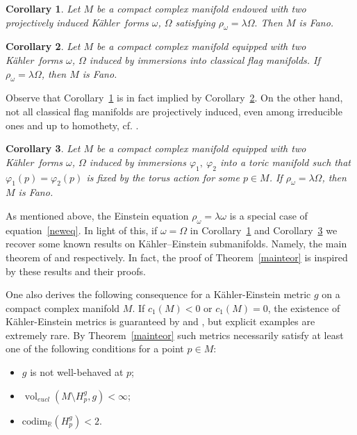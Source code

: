 \documentclass[12pt]{amsart}
\newcommand{\R}{\mathbb{R}}
\newcommand{\codim}{\mathrm{codim}}
\newcommand{\K}{K\"{a}hler}
\newcommand{\vol}{{\operatorname{vol}}}
\newtheorem{cor}{Corollary}
\begin{document}
\begin{cor}\label{Cor1}
Let $M$ be a compact complex manifold endowed with two projectively induced \K\ forms $\omega$, $\Omega$ satisfying
$\rho_\omega=\lambda\Omega.$ Then $M$ is Fano.
\end{cor}
\begin{cor}\label{Cor2}
	Let $M$ be a compact complex manifold equipped with two \K\ forms $\omega$, $\Omega$ induced by immersions into classical flag manifolds. If $\rho_\omega=\lambda\Omega$, then $M$ is Fano.
\end{cor}
Observe that Corollary~\ref{Cor1} is in fact implied by Corollary~\ref{Cor2}. On the other hand, not all classical flag manifolds are projectively induced, even among irreducible ones and up to homothety, cf. \cite{LoiMossa23Rigidity}.

\begin{cor}\label{Cor3}
	Let $M$ be a compact complex manifold equipped with two \K\ forms $\omega$, $\Omega$ induced by immersions $\varphi_1,\ \varphi_2$ into a toric manifold such that $\varphi_1(p)=\varphi_2(p)$ is fixed by the torus action for some $p\in M$. If $\rho_\omega=\lambda\Omega$, then $M$ is Fano.
\end{cor}

As mentioned above, the Einstein equation $\rho_\omega=\lambda\omega$ is a special case of  equation~\eqref{neweq}.
In light of this, if $\omega=\Omega$ in  Corollary~\ref{Cor1} and Corollary~\ref{Cor3} we recover some known results on \K--Einstein submanifolds.
Namely, the main theorem of \cite{Hulin00KE} and \cite[Theorem~2.6]{ArezzoLoiZuddas16Toric} respectively. 
In fact, the proof of Theorem~\ref{mainteor} is inspired by these results and their proofs.

One also derives the following consequence for a  \K\--Einstein metric $g$  on a compact  complex manifold $M$. 
If $c_1(M)<0$ or $c_1(M)=0$, the existence of \K\--Einstein metrics is guaranteed by \cite{Aubin78KE} and \cite{Yau78CalabiConjecture}, but explicit examples are extremely rare. 
By Theorem~\ref{mainteor} such metrics necessarily satisfy at least one of the following conditions for a point $p\in M$: 
\begin{itemize}
	\item 
	$g$ is  not well-behaved at $p$;
	\item
	$\vol_{eucl} (M\setminus H_p^g, g)<\infty$;
	\item
	$\codim_{\R}(H_p^g)< 2$.
\end{itemize}
\end{document}
